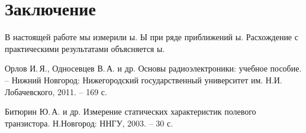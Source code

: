 \documentclass[a4paper,14pt]{extarticle}
\begin{document}
\section*{Заключение}
В настоящей работе мы измерили ы.
Ы при ряде приближений ы.
Расхождение с практическими результатами объясняется ы.



\begin{thebibliography}{}
   Орлов И.\,Я., Односевцев В.\,А. и др. Основы радиоэлектроники: учебное пособие. -- Нижний Новгород: Нижегородский государственный университет им. Н.И. Лобачевского, 2011. -- 169 с.
  
   Битюрин\,\,Ю.\,А. и др. Измерение статических характеристик полевого транзистора. Н.Новгород: ННГУ, 2003. -- 30 с.
  
\end{thebibliography}
\end{document}
